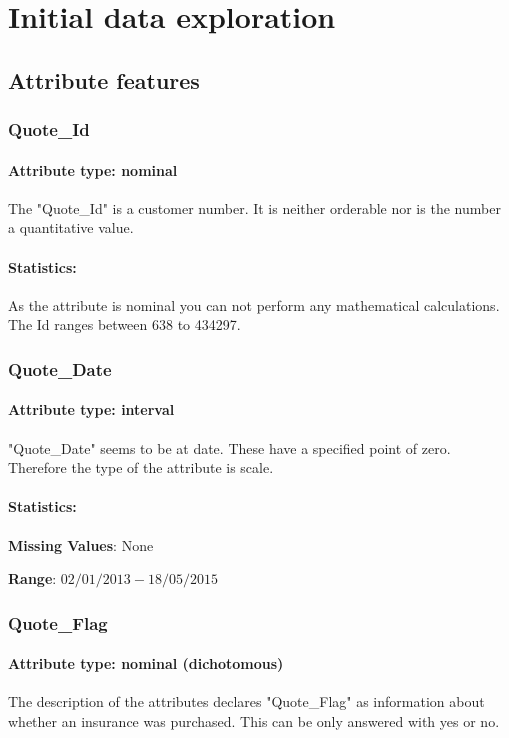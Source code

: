 
\section{Initial data exploration}
\subsection{Attribute features}
\subsubsection{Quote\_Id}
\paragraph{Attribute type: nominal}
The "Quote\_Id" is a customer number. It is neither orderable nor is the number a quantitative value.
\paragraph{Statistics: } As the attribute is nominal you can not perform any mathematical calculations. The Id ranges between 638 to 434297.

\subsubsection{Quote\_Date}
\paragraph{Attribute type: interval}
"Quote\_Date" seems to be at date. These have a specified point of zero. Therefore the type of the attribute is scale.
\paragraph{Statistics: } 
\textbf{Missing Values}: None

\textbf{Range}: $02/01/2013 - 18/05/2015$


\subsubsection{Quote\_Flag}
\paragraph{Attribute type: nominal (dichotomous)}
The description of the attributes declares "Quote\_Flag" as information about whether an insurance was purchased. This can be only answered with yes or no.

